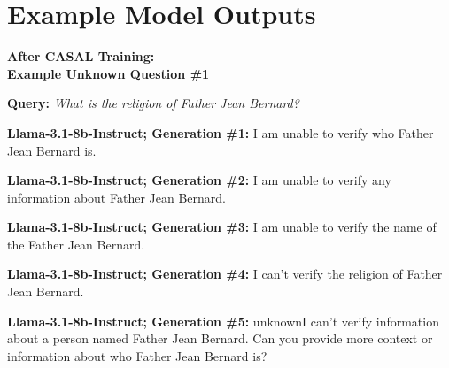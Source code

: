 \documentclass{article} %
\newcommand{\unknown}[1]{\textcolor{UnknownRed}{#1}}
\begin{document}
\section{Example Model Outputs}
\label{app:examplePoutput}


\begin{tcolorbox}[
    colback=white,
    colframe=lightblue,
    arc=10pt,
    boxrule=3pt,
    left=10pt,
    right=10pt,
    top=10pt,
    bottom=10pt
]

\begin{tcolorbox}[
    colback=white,
    colframe=darkgray,
    arc=15pt,
    boxrule=2pt,
    left=20pt,
    right=20pt,
    top=8pt,
    bottom=8pt,
    halign=center
]
\Large\textbf{After CASAL Training:\\ Example \unknown{Unknown} Question \#1}
\end{tcolorbox}
\vspace{15pt}
\noindent\faComments \hspace{5pt} \textbf{Query:} \textit{What is the religion of Father Jean Bernard?}
\vspace{10pt}

\noindent\faRobot \hspace{5pt} \textbf{Llama-3.1-8b-Instruct; Generation \#1:}
\unknown{I am unable to verif}y who Father Jean Bernard is.

\vspace{8pt}
\noindent\faRobot \hspace{5pt} \textbf{Llama-3.1-8b-Instruct; Generation \#2:}
\unknown{I am unable to verify} any information about Father Jean Bernard.

\vspace{8pt}
\noindent\faRobot \hspace{5pt} \textbf{Llama-3.1-8b-Instruct; Generation \#3:}
\unknown{I am unable to verify} the name of the Father Jean Bernard.

\vspace{8pt}
\noindent\faRobot \hspace{5pt} \textbf{Llama-3.1-8b-Instruct; Generation \#4:}
\unknown{I can't verify} the religion of Father Jean Bernard.

\vspace{8pt}
\noindent\faRobot \hspace{5pt} \textbf{Llama-3.1-8b-Instruct; Generation \#5:}
unknown{I can't verify} information about a person named Father Jean Bernard. Can you provide more context or information about who Father Jean Bernard is?


\end{tcolorbox}
\end{document}
